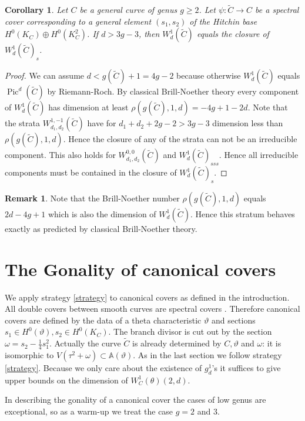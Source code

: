 \documentclass[12pt]{extarticle}
\newtheorem{corollary}[theorem]{Corollary}
\theoremstyle{definition}
\newtheorem{remark}[theorem]{Remark}
\numberwithin{theorem}{section}
\newcommand{\Aff}{\mathbb{A}}
\newcommand{\op}{\operatorname}
\renewcommand{\tilde}{\widetilde}		%
\begin{document}
\begin{corollary}\label{cor:closure_stable_locus}
Let $C$ be a general curve of genus $g\geq 2$. Let $\psi: \tilde{C} \to C$ be a spectral cover corresponding to a general element $(s_1,s_2)$ of the Hitchin base $H^0(K_C)\oplus H^0(K_C^2)$. If $d > 3g-3$, then $W^1_d(\tilde{C})$ equals the closure of $W^1_d(\tilde{C})_s$.
\end{corollary}
\begin{proof}
We can assume $d < g(\tilde{C}) +1 = 4g-2$ because otherwise $W^1_d(\tilde{C})$ equals $\op{Pic}^d(\tilde{C})$ by Riemann-Roch. By classical Brill-Noether theory every component of $W^1_d(\tilde{C})$ has dimension at least $\rho(g(\tilde{C}),1,d) = -4g + 1 -2d$. Note that the strata $W^{1,-1}_{d_1,d_2}(\tilde{C})$ have for $d_1 + d_2 + 2g-2 > 3g-3$ dimension less than $\rho(g(\tilde{C}),1,d)$. Hence the closure of any of the strata can not be an irreducible component. This also holds for $W^{0,0}_{d_1,d_2}(\tilde{C})$ and $W^1_d(\tilde{C})_{sss}$. Hence all irreducible components must be contained in the closure of $W^1_d(\tilde{C})_s$. 
\end{proof}
\begin{remark}
Note that the Brill-Noether number $\rho(g(\tilde{C}),1,d)$ equals $2d - 4g+1$ which is also the dimension of $W^1_d(\tilde{C})$. Hence this stratum behaves exactly as predicted by classical Brill-Noether theory. 
\end{remark}
\section{The Gonality of canonical covers}\label{section:gonality}
We apply strategy \ref{strategy} to canonical covers as defined in the introduction. 
All double covers between smooth curves are spectral covers \cite[section 0.2]{Cossecdolgachev}. Therefore canonical covers are defined by the data of a theta characteristic $\vartheta$ and sections $s_1 \in H^0(\vartheta),s_2 \in H^0(K_C)$. The branch divisor is cut out by the section $\omega = s_2 - \frac{1}{4}s_1^2$. Actually the curve $\tilde{C}$ is already determined by $C,\vartheta$ and $\omega$: it is isomorphic to $V(\tau^2 + \omega) \subset \Aff(\vartheta)$. As in the last section we follow strategy \ref{strategy}. Because we only care about the existence of $g^1_d$'s it suffices to give upper bounds on the dimension of $W^1_C(\theta)(2,d)$.

In describing the gonality of a canonical cover the cases of low genus are exceptional, so as a warm-up we treat the case $g =2$ and $3$.
\end{document}
